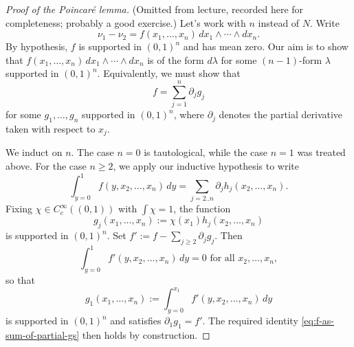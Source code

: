 \documentclass[reqno]{amsart} 
\begin{document}
\begin{proof}
[Proof of the Poincar{\'e} lemma]
  (Omitted from lecture, recorded here for completeness; probably a good exercise.)  Let's work with $n$ instead of $N$.  Write
  \begin{equation*}
    \nu_1 - \nu_2 = f(x_1,\dotsc,x_n) \, d x_1 \wedge \dotsb \wedge d x_n.
  \end{equation*}
  By hypothesis, $f$ is supported in $(0,1)^n$ and has mean zero.  Our aim is to show that $f(x_1,\dotsc,x_n) \, d x_1 \wedge \dotsb \wedge d x_n$ is of the form $d \lambda$ for some $(n-1)$-form $\lambda$ supported in $(0,1)^n$.  Equivalently, we must show that
  \begin{equation}\label{eq:f-as-sum-of-partial-gs}
    f = \sum_{j=1}^n \partial_j g_j
  \end{equation}
  for some $g_1,\dotsc,g_n$ supported in $(0,1)^n$, where $\partial_j$ denotes the partial derivative taken with respect to $x_j$.

  We induct on $n$.  The case $n = 0$ is tautological, while the case $n = 1$ was treated above.  For the case $n \geq 2$, we apply our inductive hypothesis to write
  \begin{equation*}
    \int_{y=0}^1 f(y,x_2,\dotsc,x_n) \, d y = \sum_{j=2..n} \partial_{j} h_j(x_2,\dotsc,x_n).
  \end{equation*}
  Fixing $\chi \in C_c^\infty((0,1))$ with $\int \chi = 1$, the function
  \begin{equation*}
    g_j(x_1,\dotsc,x_n) :=
    \chi(x_1) h_j(x_2,\dotsc,x_n)
  \end{equation*}
  is supported in $(0,1)^n$.  Set $f' := f - \sum_{j \geq 2} \partial_j g_j$.  Then
  \begin{equation*}
    \int_{y=0}^1 f'(y,x_2,\dotsc,x_n) \, d y = 0 \text{ for all } x_2,\dotsc,x_n,
  \end{equation*}
  so that
  \begin{equation*}
    g_1(x_1,\dotsc,x_n) := \int_{y=0}^{x_1} f'(y,x_2,\dotsc,x_n) \, d y
  \end{equation*}
  is supported in $(0,1)^n$ and satisfies $\partial_1 g_1 = f'$.  The required identity \eqref{eq:f-as-sum-of-partial-gs} then holds by construction.
\end{proof}
\end{document}
